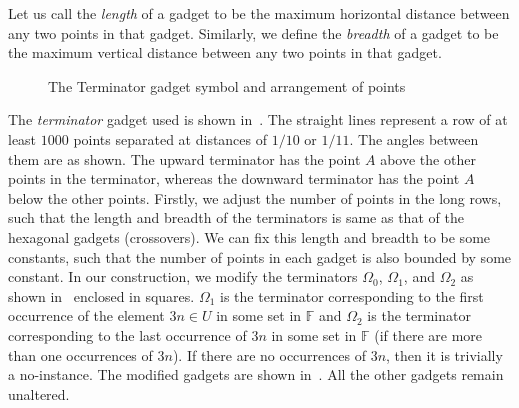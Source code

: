 Let us call the \emph{length} of a gadget to be the maximum horizontal distance between any two points in that gadget. Similarly, we define the \emph{breadth} of a gadget to be the maximum vertical distance between any two points in that gadget.




\begin{figure}[h] 
\centering
{}   \qquad\qquad
{}
    \qquad\qquad
{}
\caption{The Terminator gadget symbol and arrangement of points}  
\label{fig:terminator}
\end{figure}

The \emph{terminator} gadget used is shown in~. The straight lines represent a row of at least $1000$ points separated at distances of $1/10$ or $1/11$. The angles between them are as shown. The upward terminator has the point $A$ above the other points in the terminator, whereas the downward terminator has the point $A$ below the other points. Firstly, we adjust the number of points in the long rows, such that the length and breadth of the terminators is same as that of the hexagonal gadgets (crossovers). We can fix this length and breadth to be some constants, such that the number of points in each gadget is also bounded by some constant. In our construction, we modify the terminators $\Omega_0$, $\Omega_1$, and $\Omega_2$ as shown in~ enclosed in squares. $\Omega_1$ is the terminator corresponding to the first occurrence of the element $3n\in U$ in some set in $\mathbb{F}$ and $\Omega_2$ is the terminator corresponding to the last occurrence of $3n$ in some set in $\mathbb{F}$ (if there are more than one occurrences of $3n$). If there are no occurrences of $3n$, then it is trivially a no-instance. The modified gadgets are shown in~. All the other gadgets remain unaltered.

